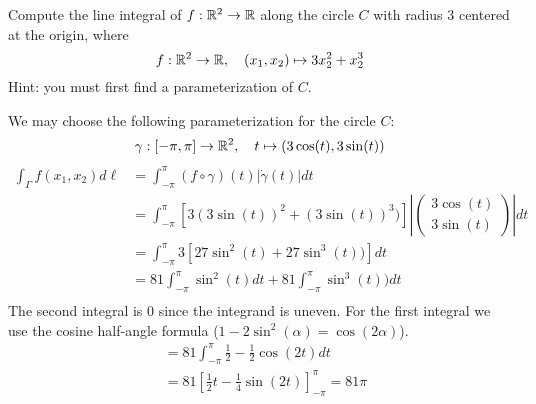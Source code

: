 \documentclass[11pt]{article}
\begin{document}
\begin{exercise}
    Compute the line integral of $f : \mathbb{R}^2 \rightarrow \mathbb{R}$ 
    along the circle $C$ with radius $3$ centered at the origin, where 
    \[
        f : \mathbb{R}^2 \to \mathbb{R}, \quad (x_1,x_2) \mapsto 3 x_2^2 + x_2^3
    \]
    Hint: you must first find a parameterization of $C$. 
\end{exercise}
\begin{solution} 
	We may choose the following parameterization for the circle $C$:
    $$
        \gamma : [-\pi,\pi] \rightarrow \mathbb{R}^2, \quad t \mapsto ( 3\cos(t), 3\sin(t) )
    $$
    \begin{align*}
        \int_{\Gamma} f(x_1,x_2) d\ell &= \int_{-\pi}^{\pi} (f\circ \gamma)(t)|\dot{\gamma}(t)|dt
        \\&=
        \int_{-\pi}^{\pi} \left[3(3\sin(t))^2+(3\sin(t))^3)\right]\left|\begin{pmatrix}3\cos(t)\\3\sin(t)\end{pmatrix}\right| dt
        \\&=
        \int_{-\pi}^{\pi} 3\left[27\sin^2(t)+27\sin^3(t))\right]dt
        \\&=
        81\int_{-\pi}^{\pi} \sin^2(t)dt+ 81\int_{-\pi}^{\pi}\sin^3(t))dt\\
    \end{align*}
    The second integral is $0$ since the integrand is uneven. For the first integral we use the cosine half-angle formula ($1 - 2\sin^2(\alpha) = \cos(2\alpha)$).
    \begin{align*}
        &= 81\int_{-\pi}^{\pi} \frac{1}{2} - \frac{1}{2}\cos(2t)dt
        \\&= 81 \left[ \frac{1}{2} t - \frac{1}{4}\sin(2t) \right]_{-\pi}^{\pi} = 81\pi
    \end{align*}
\end{solution}
\end{document}
